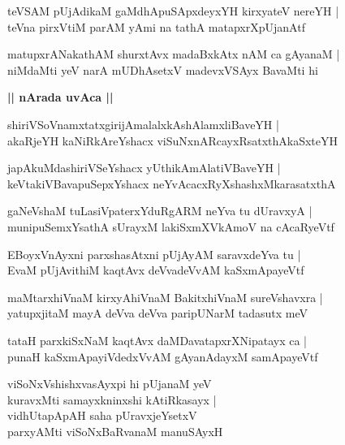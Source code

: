 \documentclass[twoside,12pt,openright]{book}
\newcounter{shloka}[chapter]
\def\uvaca#1{\centerline{{\large\textbf{#1}}}}
\begin{document}
\begin{shloka}%
teVSAM pUjAdikaM gaMdhApuSApxdeyxYH kirxyateV nereYH |\\
teVna pirxVtiM parAM yAmi na tathA matapxrXpUjanAtf
\end{shloka}

\begin{shloka}%
matupxrANakathAM shurxtAvx madaBxkAtx nAM ca gAyanaM |\\
niMdaMti yeV narA mUDhAsetxV madevxVSAyx BavaMti hi 
\end{shloka}

\uvaca{|| nArada uvAca ||}

\begin{shloka}%
shiriVSoVnamxtatxgirijAmalalxkAshAlamxliBaveYH |\\
akaRjeYH kaNiRkAreYshacx viSuNxnARcayxRsatxthAkaSxteYH
\end{shloka}

\begin{shloka}%
japAkuMdashiriVSeYshacx yUthikAmAlatiVBaveYH |\\
keVtakiVBavapuSepxYshacx neYvAcacxRyXshashxMkarasatxthA 
\end{shloka}

\begin{shloka}%
gaNeVshaM tuLasiVpaterxYduRgARM neYva tu dUravxyA |\\
munipuSemxYsathA sUrayxM lakiSxmXVkAmoV na cAcaRyeVtf 
\end{shloka}

\begin{shloka}%
EBoyxVnAyxni parxshasAtxni pUjAyAM saravxdeYva tu |\\
EvaM pUjAvithiM kaqtAvx deVvadeVvAM kaSxmApayeVtf 
\end{shloka}

\begin{shloka}%
maMtarxhiVnaM kirxyAhiVnaM BakitxhiVnaM sureVshavxra |\\
yatupxjitaM mayA deVva deVva paripUNarM tadasutx meV 
\end{shloka}

\begin{shloka}%
tataH parxkiSxNaM kaqtAvx daMDavatapxrXNipatayx ca |\\
punaH kaSxmApayiVdedxVvAM gAyanAdayxM samApayeVtf 
\end{shloka}

\begin{shloka}%
viSoNxVshishxvasAyxpi hi pUjanaM yeV \\
kuravxMti samayxkninxshi kAtiRkasayx |\\
vidhUtapApAH saha pUravxjeYsetxV \\
parxyAMti viSoNxBaRvanaM manuSAyxH 
\end{shloka}
\end{document}
